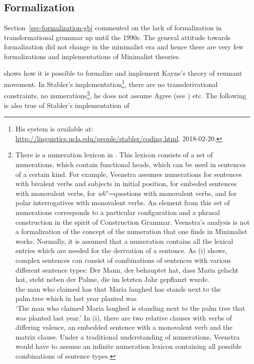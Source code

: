 \subsection{Formalization}
\label{sec-formalization-minimalism}

Section~\ref{sec-formalization-gb} commented on the lack of formalization in transformational
grammar up until the 1990s. The general attitude towards formalization did not change in the
minimalist era and hence there are very few formalizations and implementations of Minimalist theories.

\largerpage[-1]
\citet{Stabler2001a} shows how it is possible to formalize and implement Kayne's theory of remnant movement. In
Stabler's implementation\footnote{%
	His system is available at:
\url{http://linguistics.ucla.edu/people/stabler/coding.html}. 2018-02-20.
}, there are no transderivational
constraints, no numerations\footnote{%
	There is a numeration lexicon in \citet[Chapter~9]{Veenstra98a}. This lexicon consists of a set of numerations, which contain functional
	heads, which can be used in sentences of a certain kind. For example, Veenstra assumes numerations for sentences with bivalent verbs
	and subjects in initial position, for embeded sentences with monovalent verbs, for \emph{wh}"=questions with monovalent verbs, and
	for polar interrogatives with monovalent verbs. An element from this set of numerations corresponds to a particular configuration and a
	phrasal construction in the spirit of Construction Grammar\indexcxg. Veenstra's analysis is not a formalization of the concept of the numeration
	that one finds in Minimalist works. Normally, it is assumed that a numeration contains all the lexical entries which are needed for the derivation
	of a sentence. As (i) shows, complex sentences can consist of combinations of sentences with
        various different sentence types: 
\ea
\gll Der Mann, der behauptet hat, dass Maria gelacht hat, steht neben der Palme, die im letzten Jahr gepflanzt wurde.\\
     the man who claimed has that Maria laughed has stands next.to the palm.tree which in last year planted was\\
\glt `The man who claimed Maria laughed is standing next to the palm tree that was planted last year.'
\z
In (i), there are two relative clauses with verbs of differing valence, an embedded sentence with a monovalent verb and the matrix clause.
Under a traditional understanding of numerations, Veenstra would have to assume an infinite numeration lexicon containing all possible
combinations of sentence types.
}, he does not assume Agree (see \citealp[]{Fong2014a}) etc. The following is also true of Stabler's implementation of 
